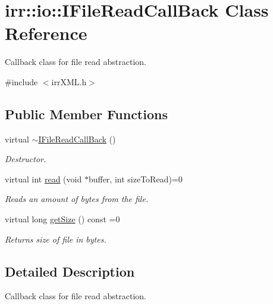 \hypertarget{classirr_1_1io_1_1IFileReadCallBack}{}\section{irr\+:\+:io\+:\+:I\+File\+Read\+Call\+Back Class Reference}
\label{classirr_1_1io_1_1IFileReadCallBack}


Callback class for file read abstraction.  




{\ttfamily \#include $<$irr\+X\+M\+L.\+h$>$}

\subsection*{Public Member Functions}
\begin{DoxyCompactItemize}
\item 
\mbox{\label{classirr_1_1io_1_1IFileReadCallBack_a91ace84f0a3966d88d78da5342eb9619}} 
virtual \hyperlink{classirr_1_1io_1_1IFileReadCallBack_a91ace84f0a3966d88d78da5342eb9619}{$\sim$\+I\+File\+Read\+Call\+Back} ()
\begin{DoxyCompactList}\small\item\em Destructor. \end{DoxyCompactList}\item 
virtual int \hyperlink{classirr_1_1io_1_1IFileReadCallBack_ae8c57b8454078aa2acd39772a6aa4439}{read} (void $\ast$buffer, int size\+To\+Read)=0
\begin{DoxyCompactList}\small\item\em Reads an amount of bytes from the file. \end{DoxyCompactList}\item 
\mbox{\label{classirr_1_1io_1_1IFileReadCallBack_aba9a5b45e5cdead9fb12def3069bd0ec}} 
virtual long \hyperlink{classirr_1_1io_1_1IFileReadCallBack_aba9a5b45e5cdead9fb12def3069bd0ec}{get\+Size} () const =0
\begin{DoxyCompactList}\small\item\em Returns size of file in bytes. \end{DoxyCompactList}\end{DoxyCompactItemize}


\subsection{Detailed Description}
Callback class for file read abstraction. 

